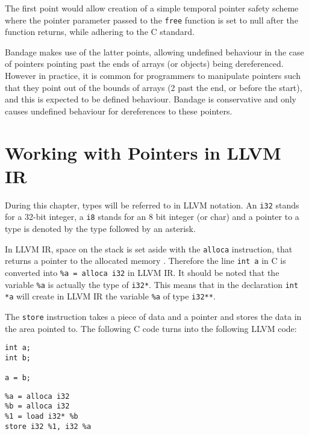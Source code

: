 The first point would allow creation of a simple temporal pointer safety scheme where the pointer parameter passed to the \verb!free! function is set to null after the function returns, while adhering to the C standard.

Bandage makes use of the latter points, allowing undefined behaviour in the case of pointers pointing past the ends of arrays (or objects) being dereferenced.
However in practice, it is common for programmers to manipulate pointers such that they point out of the bounds of arrays (2 past the end, or before the start), and this is expected to be defined behaviour.
Bandage is conservative and only causes undefined behaviour for dereferences to these pointers.

\section{Working with Pointers in LLVM IR}

During this chapter, types will be referred to in LLVM notation.
An \verb!i32! stands for a 32-bit integer, a \verb!i8! stands for an 8 bit integer (or char) and a pointer to a type is denoted by the type followed by an asterisk.

In LLVM IR, space on the stack is set aside with the \verb!alloca! instruction, that returns a pointer to the allocated memory \cite{llvmLangRef}.
Therefore the line \verb!int a! in C is converted into \verb!%a = alloca i32! in LLVM IR.
It should be noted that the variable \verb!%a! is actually the type of \verb!i32*!.
This means that in the declaration \verb!int *a! will create in LLVM IR the variable \verb!%a! of type \verb!i32**!.

The \verb!store! instruction takes a piece of data and a pointer and stores the data in the area pointed to.
The following C code turns into the following LLVM code:

\begin{minipage}[t]{0.5\linewidth}
\begin{verbatim}
int a;
int b;

a = b;
\end{verbatim}
\end{minipage}
\begin{minipage}[t]{0.5\linewidth}
\begin{verbatim}
%a = alloca i32
%b = alloca i32
%1 = load i32* %b
store i32 %1, i32 %a
\end{verbatim}
\end{minipage}

